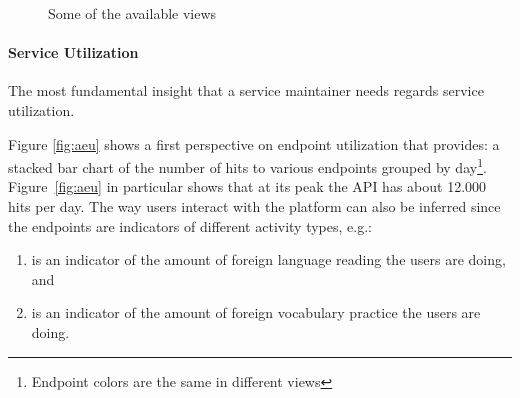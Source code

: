 \documentclass{sig-alternate-05-2015}
\begin{document}

\begin{figure}[t]
	\centering
	\qquad
	\qquad
	\caption{Some of the available views\label{fig:views}}
\end{figure}

     



\paragraph{Service Utilization}
\label{sec:util}

The most fundamental insight that a service maintainer needs regards service utilization. %

Figure \ref{fig:aeu} shows a first perspective on endpoint utilization that \tool provides: a stacked bar chart of the number of hits to various endpoints grouped by day\footnote{Endpoint colors are the same in different views}. Figure~\ref{fig:aeu} in particular shows that at its peak the API has about 12.000 hits per day. 
The way users interact with the platform can also be inferred since the endpoints are indicators of different activity types, e.g.: 

\begin{enumerate}
	
	\item {\color{myred} \epTranslations} is an indicator of the amount of foreign language reading the users are doing, and 
	
	\item {\color{mygreen} \epOutcome} is an indicator of the amount of foreign vocabulary practice the users are doing.
	
\end{enumerate}


\end{document}
